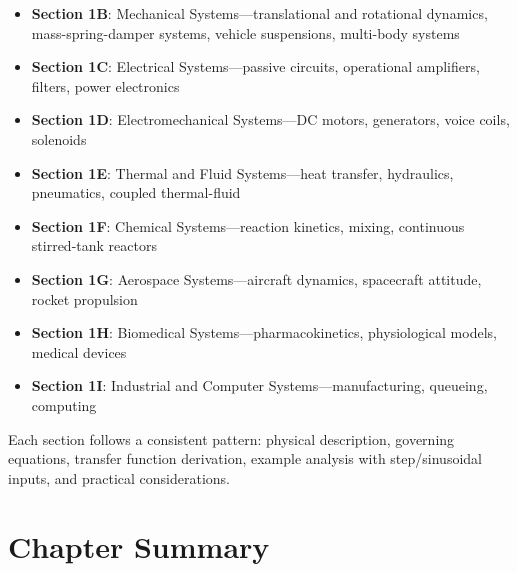 \begin{itemize}
    \item \textbf{Section 1B}: Mechanical Systems---translational and rotational dynamics, mass-spring-damper systems, vehicle suspensions, multi-body systems

    \item \textbf{Section 1C}: Electrical Systems---passive circuits, operational amplifiers, filters, power electronics

    \item \textbf{Section 1D}: Electromechanical Systems---DC motors, generators, voice coils, solenoids

    \item \textbf{Section 1E}: Thermal and Fluid Systems---heat transfer, hydraulics, pneumatics, coupled thermal-fluid

    \item \textbf{Section 1F}: Chemical Systems---reaction kinetics, mixing, continuous stirred-tank reactors

    \item \textbf{Section 1G}: Aerospace Systems---aircraft dynamics, spacecraft attitude, rocket propulsion

    \item \textbf{Section 1H}: Biomedical Systems---pharmacokinetics, physiological models, medical devices

    \item \textbf{Section 1I}: Industrial and Computer Systems---manufacturing, queueing, computing
\end{itemize}

Each section follows a consistent pattern: physical description, governing equations, transfer function derivation, example analysis with step/sinusoidal inputs, and practical considerations.

\chapter{Chapter Summary}
\label{ch:chapter_summary}

